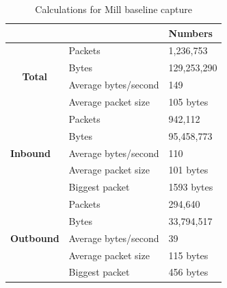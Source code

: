 \begin{table}[H]
    \caption{Calculations for Mill baseline capture}
    \centering
    \begin{tabular}{ll|l|}
        \cline{3-3}                                              &                      & \textbf{Numbers} \\ \hline
        \multicolumn{1}{|c|}{\multirow{4}{*}{\textbf{Total}}}    & Packets              & 1,236,753       \\ \cline{2-3} 
        \multicolumn{1}{|c|}{}                                   & Bytes                & 129,253,290     \\ \cline{2-3} 
        \multicolumn{1}{|c|}{}                                   & Average bytes/second & 149             \\ \cline{2-3} 
        \multicolumn{1}{|c|}{}                                   & Average packet size  & 105 bytes       \\ \hline
        \multicolumn{1}{|l|}{\multirow{5}{*}{\textbf{Inbound}}}  & Packets              & 942,112         \\ \cline{2-3} 
        \multicolumn{1}{|l|}{}                                   & Bytes                & 95,458,773      \\ \cline{2-3} 
        \multicolumn{1}{|l|}{}                                   & Average bytes/second & 110             \\ \cline{2-3} 
        \multicolumn{1}{|l|}{}                                   & Average packet size  & 101 bytes       \\ \cline{2-3} 
        \multicolumn{1}{|l|}{}                                   & Biggest packet       & 1593 bytes      \\ \hline
        \multicolumn{1}{|l|}{\multirow{5}{*}{\textbf{Outbound}}} & Packets              & 294,640         \\ \cline{2-3} 
        \multicolumn{1}{|l|}{}                                   & Bytes                & 33,794,517      \\ \cline{2-3} 
        \multicolumn{1}{|l|}{}                                   & Average bytes/second & 39              \\ \cline{2-3} 
        \multicolumn{1}{|l|}{}                                   & Average packet size  & 115 bytes       \\ \cline{2-3} 
        \multicolumn{1}{|l|}{}                                   & Biggest packet       & 456 bytes       \\ \hline
    \end{tabular}
    \label{tab:MillBaselineCalculations}
\end{table}

